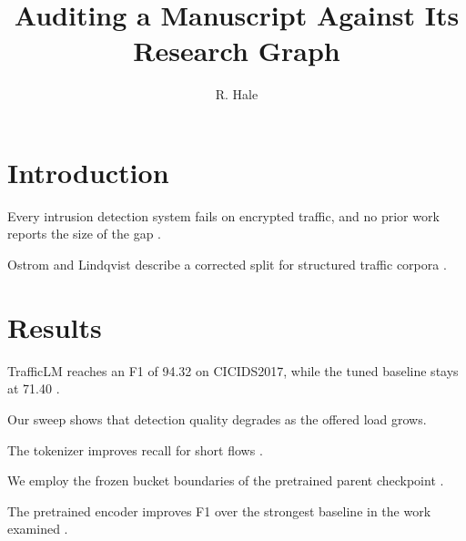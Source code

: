\documentclass[11pt]{article}
\title{Auditing a Manuscript Against Its Research Graph}
\author{R. Hale}
\begin{document}
\maketitle

\section{Introduction}
\label{sec:intro}

Every intrusion detection system fails on encrypted traffic, and no prior work reports
the size of the gap \citep{author2023}.

Ostrom and Lindqvist describe a corrected split for structured traffic corpora
\citep{ostrom2020}.

\section{Results}

TrafficLM reaches an F1 of 94.32 on CICIDS2017, while the tuned baseline stays at 71.40
\citep{author2023}.

Our sweep shows that detection quality degrades as the offered load grows.

The tokenizer improves recall for short flows \citep{author2023}.

We employ the frozen bucket boundaries of the pretrained parent checkpoint
\citep{author2023}.

The pretrained encoder improves F1 over the strongest baseline in the work examined
\citep{author2023}.



\end{document}
